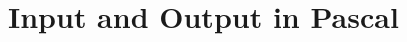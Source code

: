 \cleardoublepage
\def\pageLang{pas}

\section{Input and Output in Pascal} %
\label{sec:file_io_in_pascal}





